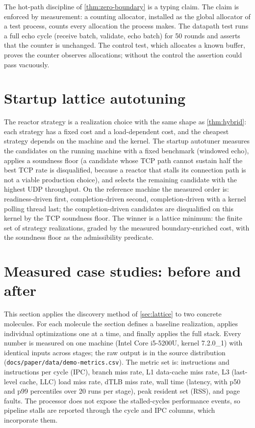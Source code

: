 The hot-path discipline of \autoref{thm:zero-boundary} is a typing
claim. The claim is enforced by measurement: a counting allocator,
installed as the global allocator of a test process, counts every
allocation the process makes. The datapath test runs a full echo
cycle (receive batch, validate, echo batch) for 50 rounds and asserts
that the counter is unchanged. The control test, which allocates a
known buffer, proves the counter observes allocations; without the
control the assertion could pass vacuously.

\section{Startup lattice autotuning}\label{sec:autotune}

The reactor strategy is a realization choice with the same shape as
\autoref{thm:hybrid}: each strategy has a fixed cost and a
load-dependent cost, and the cheapest strategy depends on the machine
and the kernel. The startup autotuner measures the candidates on the
running machine with a fixed benchmark (windowed echo), applies a
soundness floor (a candidate whose TCP path cannot sustain half the
best TCP rate is disqualified, because a reactor that stalls its
connection path is not a viable production choice), and selects the
remaining candidate with the highest UDP throughput. On the reference
machine the measured order is: readiness-driven first, completion-driven
second, completion-driven with a kernel polling thread last; the
completion-driven candidates are disqualified on this kernel by the TCP
soundness floor. The winner is a lattice minimum: the finite set of
strategy realizations, graded by the measured boundary-enriched cost,
with the soundness floor as the admissibility predicate.

\section{Measured case studies: before and after}\label{sec:demos}

This section applies the discovery method of \autoref{sec:lattice} to
two concrete molecules. For each molecule the section defines a
baseline realization, applies individual optimizations one at a time,
and finally applies the full stack. Every number is measured on one
machine (Intel Core i5-5200U, kernel 7.2.0\_1) with identical inputs
across stages; the raw output is in the source distribution
(\texttt{docs/paper/data/demo-metrics.csv}). The metric set is:
instructions and instructions per cycle (IPC), branch miss rate, L1
data-cache miss rate, L3 (last-level cache, LLC) load miss rate, dTLB
miss rate, wall time (latency, with p50 and p99 percentiles over 20
runs per stage), peak resident set (RSS), and page faults. The
processor does not expose the stalled-cycles performance events, so
pipeline stalls are reported through the cycle and IPC columns, which
incorporate them.

